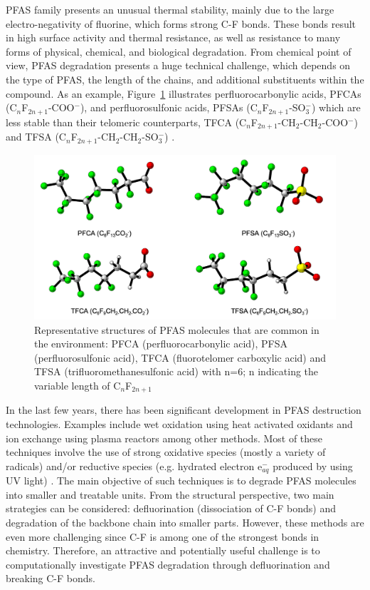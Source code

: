 \documentclass[journal,onecolumn]{IEEEtran}
\begin{document}
PFAS family presents an unusual thermal stability, mainly due to the large electro-negativity of fluorine, which forms strong C-F bonds. 
These bonds result in high surface activity and thermal resistance, as well as resistance to many forms of physical, chemical, and biological degradation. 
From chemical point of view, PFAS degradation presents a huge technical challenge, which depends on the type of PFAS, the length of the chains, and additional substituents within the compound. 
As an example, Figure~\ref{fig:representative_structures_for_qpfas} illustrates perfluorocarbonylic acids, PFCAs (C$_n$F$_{2n+1}$-COO$^-$), and perfluorosulfonic acids, PFSAs (C$_n$F$_{2n+1}$-SO$_3^-$) which are less stable than their telomeric counterparts, TFCA (C$_n$F$_{2n+1}$-CH$_2$-CH$_2$-COO$^-$) and TFSA (C$_n$F$_{2n+1}$-CH$_2$-CH$_2$-SO$_3^-$) \cite{BENTHEL2019}.

\begin{figure}[htb!]
\centering
\includegraphics[scale=0.4]{pfas_molecules.png}
\caption{Representative structures of PFAS molecules that are common in the environment: PFCA (perfluorocarbonylic acid), PFSA (perfluorosulfonic acid), TFCA (fluorotelomer carboxylic acid) and TFSA (trifluoromethanesulfonic acid) with n=6; n indicating the variable length of C$_n$F$_{2n+1}$}
\label{fig:representative_structures_for_qpfas}
\end{figure}

In the last few years, there has been significant development in PFAS destruction technologies. 
Examples include wet oxidation using heat activated oxidants \cite{BRUTON2017,PARK2016} and ion exchange using plasma reactors \cite{SALEEM2020123031,SINGH202} among other methods. 
Most of these techniques involve the use of strong oxidative species (mostly a variety of radicals) and/or reductive species (e.g. hydrated electron e$^{-}_{aq}$ produced by using UV light) \cite{liu2021}. 
The main objective of such techniques is to degrade PFAS molecules into smaller and treatable units. 
From the structural perspective, two main strategies can be considered: defluorination (dissociation of C-F bonds) and degradation of the backbone chain into smaller parts. However, these methods are even more challenging since C-F is among one of the strongest bonds in chemistry. Therefore, an attractive and potentially useful challenge is to computationally investigate PFAS degradation through defluorination and breaking C-F bonds.
\end{document}
